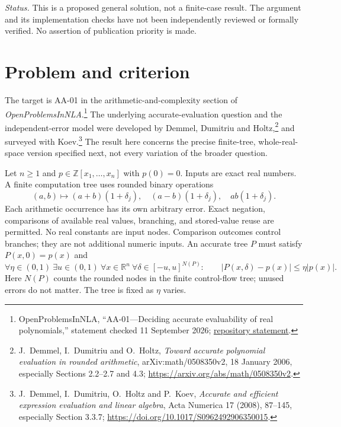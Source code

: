 \documentclass[11pt,a4paper]{article}
\theoremstyle{definition}
\theoremstyle{remark}
\newcommand{\R}{\mathbb R}
\newcommand{\Z}{\mathbb Z}
\newcommand{\abs}[1]{\lvert #1\rvert}
\begin{document}
\emph{Status.} This is a proposed general solution, not a finite-case result.
The argument and its implementation checks have not been independently reviewed
or formally verified. No assertion of publication priority is made.

\section{Problem and criterion}

The target is AA-01 in the arithmetic-and-complexity section of
\emph{OpenProblemsInNLA}.\footnote{\label{fn:repo}OpenProblemsInNLA,
``AA-01---Deciding accurate evaluability of real polynomials,'' statement checked
11 September 2026;
\href{https://raw.githubusercontent.com/ajt60gaibb/OpenProblemsInNLA/main/arithmetic-and-complexity/AA-01/README.md}{repository statement}.}
The underlying accurate-evaluation question and the independent-error model
were developed by Demmel, Dumitriu and Holtz,\footnote{\label{fn:ddh}J.~Demmel,
I.~Dumitriu and O.~Holtz, \emph{Toward accurate polynomial evaluation in rounded
arithmetic}, arXiv:math/0508350v2, 18 January 2006, especially Sections 2.2--2.7 and
4.3; \url{https://arxiv.org/abs/math/0508350v2}.}
and surveyed with Koev.\footnote{\label{fn:acta}J.~Demmel, I.~Dumitriu,
O.~Holtz and P.~Koev, \emph{Accurate and efficient expression evaluation and
linear algebra}, Acta Numerica 17 (2008), 87--145, especially Section 3.3.7;
\url{https://doi.org/10.1017/S0962492906350015}.}
The result here concerns the precise finite-tree, whole-real-space version
specified next, not every variation of the broader question.

Let $n\ge1$ and $p\in\Z[x_1,\ldots,x_n]$ with $p(0)=0$. Inputs are exact real
numbers. A finite computation tree uses rounded binary operations
\[
 (a,b)\longmapsto (a+b)(1+\delta_j),\quad
 (a-b)(1+\delta_j),\quad ab(1+\delta_j).
\]
Each arithmetic occurrence has its own arbitrary error. Exact negation,
comparisons of available real values, branching, and stored-value reuse are
permitted. No real constants are input nodes. Comparison outcomes control
branches; they are not additional numeric inputs.
An accurate tree $P$ must satisfy $P(x,0)=p(x)$ and
\begin{equation}\label{eq:accuracy}
 \forall\eta\in(0,1)\ \exists u\in(0,1)\ \forall x\in\R^n\
 \forall\delta\in[-u,u]^{N(P)}:\qquad
 \abs{P(x,\delta)-p(x)}\le\eta\abs{p(x)}.
\end{equation}
Here $N(P)$ counts the rounded nodes in the finite control-flow tree; unused
errors do not matter. The tree is fixed as $\eta$ varies.
\end{document}
